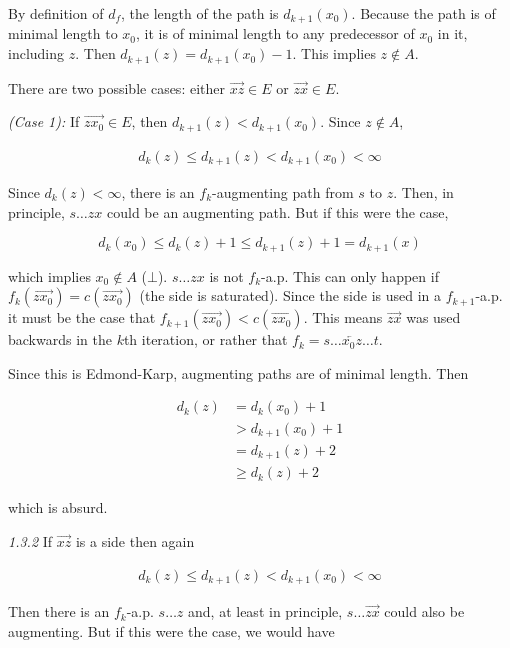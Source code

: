 \documentclass[a4paper]{article}
\begin{document}
By definition of $d_f$, the length of the path is $d_{k+1}(x_0)$. Because the
path is of minimal length to $x_0$, it is of minimal length to any predecessor
of $x_0$ in it, including $z$. Then $d_{k+1}(z) = d_{k+1}(x_0) - 1$. This
implies $z \not\in A$.

There are two possible cases: either $\overrightarrow{xz} \in E$
or $\overrightarrow{zx} \in E$.

\textit{(Case 1):} If $\overrightarrow{zx_0} \in E$, then
$d_{k+1}(z) < d_{k+1}(x_0)$. Since $z \not\in A$,

\begin{align*}
    d_k(z) \leq d_{k+1}(z) < d_{k+1}(x_0) < \infty
\end{align*}

Since $d_k(z) < \infty$, there is an $f_{k}$-augmenting path from $s$ to $z$.
Then, in principle, $s \ldots z x$ could be  an augmenting path. But
if this were the case, 

$$d_k(x_0) \leq d_k(z) + 1 \leq d_{k+1}(z) + 1 = d_{k+1}(x)$$ 

which implies $x_0 \not\in A$ ($\bot$). $s\ldots zx$ is not $f_k$-a.p. This can
only happen if $f_k(\overrightarrow{zx_0}) = c(\overrightarrow{zx_0})$ (the
side is saturated). Since the side is used in a $f_{k+1}$-a.p. it must be the
case that $f_{k+1}(\overrightarrow{zx_0}) < c(\overrightarrow{zx_0})$. This
means $\overrightarrow{zx}$ was used backwards in the $k$th iteration, or
rather that $f_k = s \ldots \overleftarrow{x_0z} \ldots t$.

Since this is Edmond-Karp, augmenting paths are of minimal length. Then 

\begin{align*}
    d_{k}(z) &= d_k(x_0) + 1   \\ 
             &> d_{k+1}(x_0) + 1 \\ 
             &=d_{k+1}(z) + 2 \\ 
             & \geq d_{k}(z) + 2
\end{align*}

which is absurd.

\textit{1.3.2} If  $\overrightarrow{xz}$ is a side then again

\begin{align*}
    d_k(z) \leq d_{k+1}(z) < d_{k+1}(x_0) < \infty
\end{align*}

Then there is an $f_k$-a.p. $s \ldots z$ and, at least in principle, 
$s \ldots \overrightarrow{zx}$ could also be augmenting. But if this were the case,
we would have 
\end{document}
